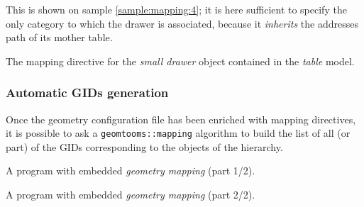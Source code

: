 This is shown on  sample \ref{sample:mapping:4}; it is here sufficient
to  specify the  only  category  to which  the  drawer is  associated,
because it \emph{inherits} the addresses path of its mother table.

\begin{sample}
  \caption{The mapping directive  for the \emph{small drawer} object 
    contained in the  \emph{table} model.} 
  \label{sample:mapping:4}
\end{sample}

\clearpage

\subsubsection{Automatic GIDs generation}

Once the  geometry configuration file  has been enriched  with mapping
directives,  it  is  possible  to  ask  a  \texttt{geomtooms::mapping}
algorithm to build the list of all (or part) of the GIDs corresponding
to   the    objects   of    the   hierarchy.   


\begin{program}[h]
\caption{A program with embedded \emph{geometry mapping} (part 1/2).}
\label{program:mapping:1}
\end{program}

\begin{program}[h]
\caption{A program with embedded \emph{geometry mapping} (part 2/2).}
\label{program:mapping:2}
\end{program}

